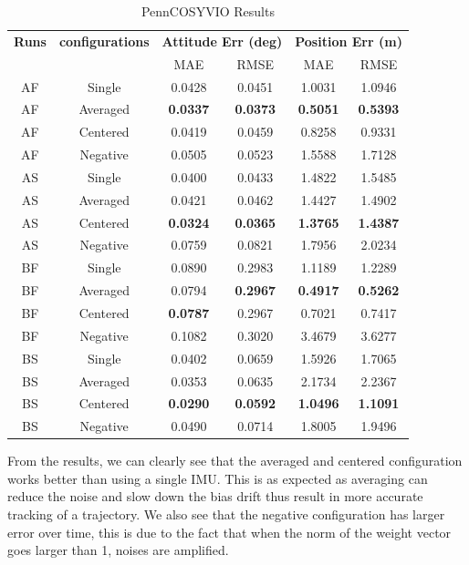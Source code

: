 \documentclass[conference]{IEEEtran}
\begin{document}
\begin{table}[h!]
\centering
\caption{PennCOSYVIO Results}
\label{tab:vio_result}
\begin{tabular}{cccccc}
\toprule
\textbf{Runs} & \textbf{configurations} & \multicolumn{2}{c}{\textbf{Attitude Err (deg)}} & \multicolumn{2}{c}{\textbf{Position Err (m)}} \\
\cmidrule(lr){3-4} \cmidrule(lr){5-6}
 & & MAE & RMSE & MAE & RMSE \\
\midrule
AF & Single    & 0.0428 & 0.0451 & 1.0031 & 1.0946 \\
AF & Averaged  & \textbf{0.0337} & \textbf{0.0373} & \textbf{0.5051} & \textbf{0.5393} \\
AF & Centered  & 0.0419 & 0.0459 & 0.8258 & 0.9331 \\
AF & Negative  & 0.0505 & 0.0523 & 1.5588 & 1.7128 \\
\midrule
AS & Single    & 0.0400 & 0.0433 & 1.4822 & 1.5485 \\
AS & Averaged  & 0.0421 & 0.0462 & 1.4427 & 1.4902 \\
AS & Centered  & \textbf{0.0324} & \textbf{0.0365} & \textbf{1.3765} & \textbf{1.4387} \\
AS & Negative  & 0.0759 & 0.0821 & 1.7956 & 2.0234 \\
\midrule
BF & Single    & 0.0890 & 0.2983 & 1.1189 & 1.2289 \\
BF & Averaged  & 0.0794 & \textbf{0.2967} & \textbf{0.4917} & \textbf{0.5262} \\
BF & Centered  & \textbf{0.0787} & 0.2967 & 0.7021 & 0.7417 \\
BF & Negative  & 0.1082 & 0.3020 & 3.4679 & 3.6277 \\
\midrule
BS & Single    & 0.0402 & 0.0659 & 1.5926 & 1.7065 \\
BS & Averaged  & 0.0353 & 0.0635 & 2.1734 & 2.2367 \\
BS & Centered  & \textbf{0.0290} & \textbf{0.0592} & \textbf{1.0496} & \textbf{1.1091} \\
BS & Negative  & 0.0490 & 0.0714 & 1.8005 & 1.9496 \\
\bottomrule
\end{tabular}
\end{table}

From the results, we can clearly see that the averaged and centered configuration works better than using a single IMU. This is as expected as averaging can reduce the noise and slow down the bias drift thus result in more accurate tracking of a trajectory. We also see that the negative configuration has larger error over time, this is due to the fact that when the norm of the weight vector goes larger than 1, noises are amplified.
\end{document}
